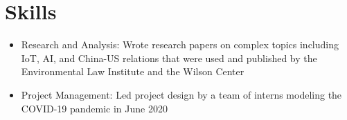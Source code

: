 \documentclass[letterpaper,11pt]{article}
\newcommand{\resumeItem}[1]{
  \item\small{
    {#1} \vspace{-2pt}
  }
}
\newcommand{\resumeSubItem}[2]{\resumeItem{#1}{#2}\vspace{-4pt}}
\newcommand{\resumeSubHeadingListStart}{\begin{itemize}[leftmargin=*]}
\newcommand{\resumeSubHeadingListEnd}{\end{itemize}}
\begin{document}

\section{Skills}
 \resumeSubHeadingListStart
    \resumeSubItem{Research and Analysis:}{Wrote research papers on complex topics including IoT, AI, and China-US relations that were used and published by the Environmental Law Institute and the Wilson Center}
    \resumeSubItem{Project Management:}{Led project design by a team of interns modeling the COVID-19 pandemic in June 2020}
 \resumeSubHeadingListEnd

\end{document}
